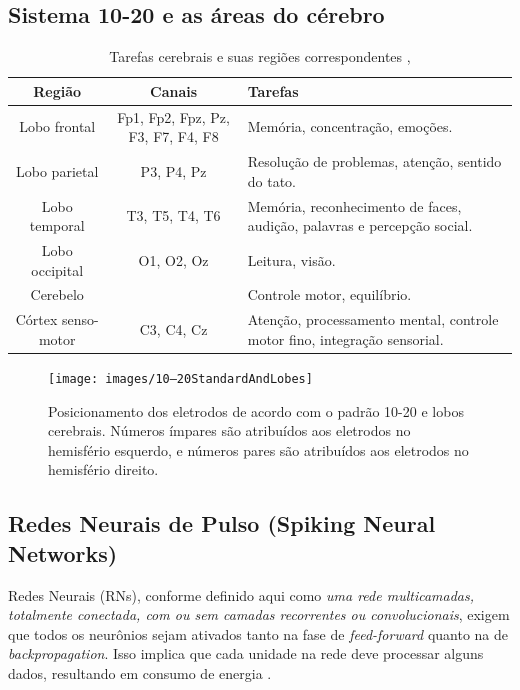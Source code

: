 			\subsection{Sistema 10-20 e as áreas do cérebro}
			\begin{table}[H]
				\begin{center}
					\caption{Tarefas cerebrais e suas regiões correspondentes \cite{sistema10-20}, \cite{JALALYBIDGOLY2020101788}}
					\begin{tabular}{|c|c|p{}|}
						\hline
						Região & Canais & Tarefas\\
						\hline
						Lobo frontal & Fp1, Fp2, Fpz, Pz, F3, F7, F4, F8 & Memória, concentração, emoções.\\
						\hline
						Lobo parietal & P3, P4, Pz & Resolução de problemas, atenção, sentido do tato. \\
						\hline
						Lobo temporal & T3, T5, T4, T6 & Memória, reconhecimento de faces, audição, palavras e percepção social. \\
						\hline
						Lobo occipital & O1, O2, Oz & Leitura, visão.\\
						\hline
						Cerebelo && Controle motor, equilíbrio. \\
						\hline
						Córtex senso-motor & C3, C4, Cz& Atenção, processamento mental, controle motor fino, integração sensorial. \\
						\hline
					\end{tabular}
					\label{tb:brainRegions}
				\end{center}
			\end{table}
			
			\begin{figure}[H]
				\centering
				\caption[Sistema 10-20 e lobos cerebrais]{Posicionamento dos eletrodos de acordo com o padrão 10-20 e lobos cerebrais. Números ímpares são atribuídos aos eletrodos no hemisfério esquerdo, e números pares são atribuídos aos eletrodos no hemisfério direito.}
				\texttt{[image: images/10–20StandardAndLobes]}
				\label{fig:1020standardandlobes}
			\end{figure}
		
		\subsection{Redes Neurais de Pulso (Spiking Neural Networks)}
			
			\par Redes Neurais (RNs), conforme definido aqui como \textit{uma rede multicamadas, totalmente conectada, com ou sem camadas recorrentes ou convolucionais}, exigem que todos os neurônios sejam ativados tanto na fase de \textit{feed-forward} quanto na de \textit{backpropagation}. Isso implica que cada unidade na rede deve processar alguns dados, resultando em consumo de energia \cite{10242251}.
			
